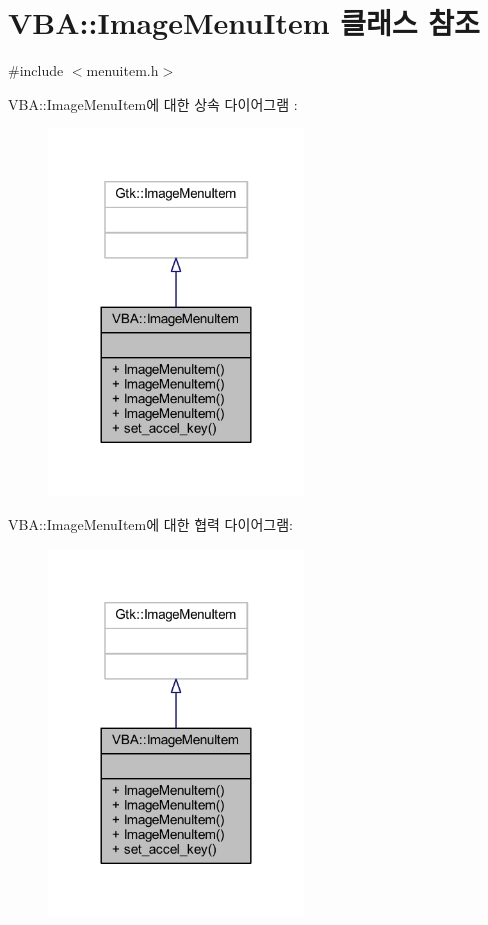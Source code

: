 \hypertarget{class_v_b_a_1_1_image_menu_item}{}\section{V\+BA\+:\+:Image\+Menu\+Item 클래스 참조}
\label{class_v_b_a_1_1_image_menu_item}


{\ttfamily \#include $<$menuitem.\+h$>$}



V\+BA\+:\+:Image\+Menu\+Item에 대한 상속 다이어그램 \+: \nopagebreak
\begin{figure}[H]
\begin{center}
\leavevmode
\includegraphics[width=192pt]{class_v_b_a_1_1_image_menu_item__inherit__graph}
\end{center}
\end{figure}


V\+BA\+:\+:Image\+Menu\+Item에 대한 협력 다이어그램\+:\nopagebreak
\begin{figure}[H]
\begin{center}
\leavevmode
\includegraphics[width=192pt]{class_v_b_a_1_1_image_menu_item__coll__graph}
\end{center}
\end{figure}
